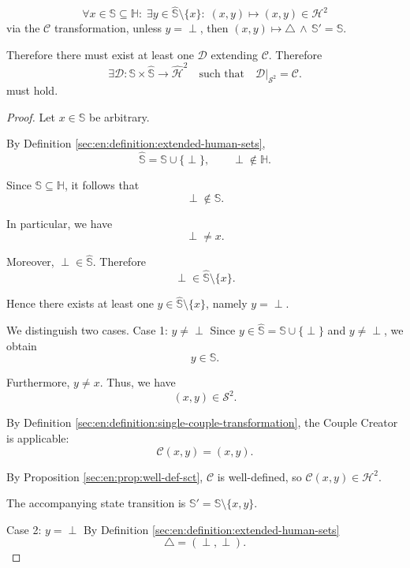\begin{theorem}\label{sec:en:theorem:date-couple-relation}
    $$\forall x\in\mathbb{S}\subseteq\mathbb{H}:\;\exists y\in\hat{\mathbb{S}}\setminus\{x\}:\;(x,y)\mapsto(x,y)\in\mathcal{H}^2$$
    via the $\mathcal{C}$ transformation, unless $y=\perp$, then $(x,y)\mapsto \triangle\,\land\,\mathbb{S}'=\mathbb{S}$.

    \begin{statement}
        Therefore there must exist at least one $\mathcal{D}$ extending $\mathcal{C}$.
        Therefore
        $$\exists\mathcal D:
            \mathbb S\times\hat{\mathbb S}
            \longrightarrow\hat{\mathcal H}^2
            \quad\text{such that}\quad
            \mathcal D|_{\mathcal S^2}=\mathcal C.$$
        must hold.
    \end{statement}
    \begin{proof}
        Let $x\in\mathbb S$ be arbitrary.

        By Definition \ref{sec:en:definition:extended-human-sets},
        $$\hat{\mathbb S}=\mathbb S\cup\{\perp\},
            \qquad \perp\notin\mathbb H.$$

        Since $\mathbb S\subseteq\mathbb H$, it follows that
        $$\perp\notin\mathbb S.$$

        In particular, we have
        $$\perp\neq x.$$

        Moreover, $\perp\in\hat{\mathbb S}$. Therefore
        $$\perp\in\hat{\mathbb S}\setminus\{x\}.$$

        Hence there exists at least one $y\in\hat{\mathbb S}\setminus\{x\}$, namely $y=\perp$.

        We distinguish two cases.
        Case 1: $y\neq\perp$
        Since $y\in\hat{\mathbb S}=\mathbb S\cup\{\perp\}$ and $y\neq\perp$, we obtain
        $$y\in\mathbb S.$$

        Furthermore, $y\neq x$. Thus, we have
        $$ (x,y)\in\mathcal S^2.$$

        By Definition \ref{sec:en:definition:single-couple-transformation}, the Couple Creator is applicable:
        $$\mathcal C(x,y)=(x,y).$$

        By Proposition \ref{sec:en:prop:well-def-sct}, $\mathcal C$ is well-defined, so $\mathcal C(x,y)\in\mathcal H^2.$

        The accompanying state transition is $\mathbb S'=\mathbb S\setminus\{x,y\}.$

        Case 2: \(y=\perp\)
        By Definition \ref{sec:en:definition:extended-human-sets}
        $$\triangle=(\perp,\perp).$$


\end{proof}
\end{theorem}
